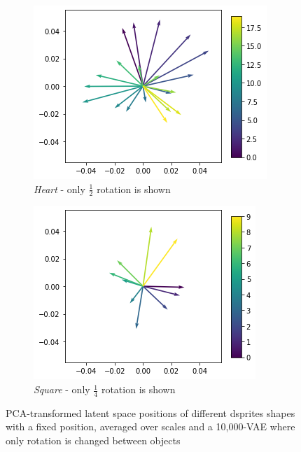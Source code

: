 \documentclass{beamer}
\begin{document}
\begin{frame}
\begin{figure}
\begin{subfigure}{.3\textwidth}
\includegraphics[width=\textwidth]{images/latent_space_traversals/vae_dsprites_orientation_latent_space_heart.png}
\caption{\textit{Heart} - only $\frac{1}{2}$ rotation is shown}
\end{subfigure}
\hfill
\begin{subfigure}{.3\textwidth}
\includegraphics[width=\textwidth]{images/latent_space_traversals/vae_dsprites_orientation_latent_space_square.png}
\caption{\textit{Square} - only $\frac{1}{4}$ rotation is shown}
\end{subfigure}
\caption{PCA-transformed latent space positions of different dsprites shapes with a fixed position, averaged over scales and a 10,000-VAE where only rotation is changed between objects}
\end{figure}
\end{frame}
\end{document}
